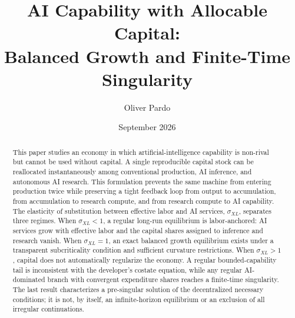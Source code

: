 \documentclass[11pt]{article}
\title{AI Capability with Allocable Capital:\\
Balanced Growth and Finite-Time Singularity}
\author{Oliver Pardo}
\date{September 2026}
\theoremstyle{definition}
\theoremstyle{remark}
\begin{document}
\maketitle

\begin{abstract}
This paper studies an economy in which artificial-intelligence capability is non-rival but cannot be used without capital. A single reproducible capital stock can be reallocated instantaneously among conventional production, AI inference, and autonomous AI research. This formulation prevents the same machine from entering production twice while preserving a tight feedback loop from output to accumulation, from accumulation to research compute, and from research compute to AI capability. The elasticity of substitution between effective labor and AI services, $\sigma_{XL}$, separates three regimes. When $\sigma_{XL}<1$, a regular long-run equilibrium is labor-anchored: AI services grow with effective labor and the capital shares assigned to inference and research vanish. When $\sigma_{XL}=1$, an exact balanced growth equilibrium exists under a transparent subcriticality condition and sufficient curvature restrictions. When $\sigma_{XL}>1$, capital does not automatically regularize the economy. A regular bounded-capability tail is inconsistent with the developer's costate equation, while any regular AI-dominated branch with convergent expenditure shares reaches a finite-time singularity. The last result characterizes a pre-singular solution of the decentralized necessary conditions; it is not, by itself, an infinite-horizon equilibrium or an exclusion of all irregular continuations.
\end{abstract}






\appendix




\end{document}
